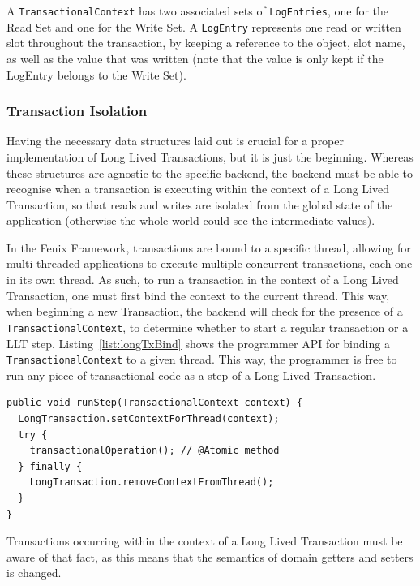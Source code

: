 \documentclass{llncs}
\begin{document}
A \texttt{TransactionalContext} has two associated sets of
\texttt{LogEntries}, one for the Read Set and one for the Write Set. A
\texttt{LogEntry} represents one read or written slot throughout the
transaction, by keeping a reference to the object, slot name, as well
as the value that was written (note that the value is only kept if the
LogEntry belongs to the Write Set).

\subsubsection{Transaction Isolation}

Having the necessary data structures laid out is crucial for a proper
implementation of Long Lived Transactions, but it is just the
beginning. Whereas these structures are agnostic to the specific
backend, the backend must be able to recognise when a transaction is
executing within the context of a Long Lived Transaction, so that
reads and writes are isolated from the global state of the application
(otherwise the whole world could see the intermediate values).

In the Fenix Framework, transactions are bound to a specific thread,
allowing for multi-threaded applications to execute multiple
concurrent transactions, each one in its own thread. As such, to run a
transaction in the context of a Long Lived Transaction, one must first
bind the context to the current thread. This way, when beginning a new
Transaction, the backend will check for the presence of a
\texttt{TransactionalContext}, to determine whether to start a regular
transaction or a LLT step. Listing~\ref{list:longTxBind} shows the
programmer API for binding a \texttt{TransactionalContext} to a given
thread. This way, the programmer is free to run any piece of
transactional code as a step of a Long Lived Transaction.

\begin{lstlisting}[caption={Example of TransactionalContext usage},
  label={list:longTxBind},float]
public void runStep(TransactionalContext context) {
  LongTransaction.setContextForThread(context);
  try {
    transactionalOperation(); // @Atomic method
  } finally {
    LongTransaction.removeContextFromThread();
  }
}
\end{lstlisting}

Transactions occurring within the context of a Long Lived Transaction
must be aware of that fact, as this means that the semantics of domain
getters and setters is changed.
\end{document}
